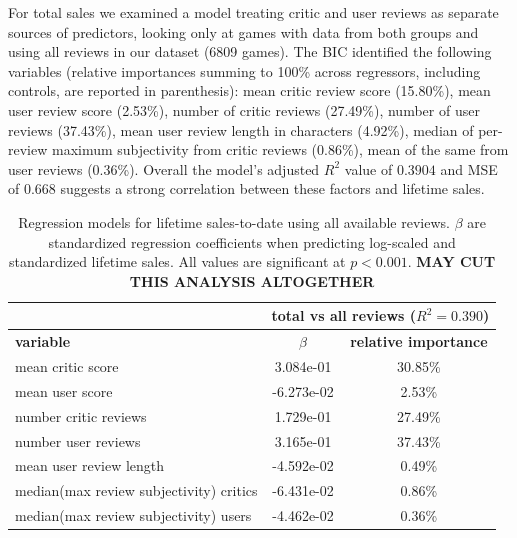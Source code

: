 \documentclass[letterpaper]{article}
\begin{document}
For total sales we examined a model treating critic and user reviews as separate sources of predictors, looking only at games with data from both groups and using all reviews in our dataset (6809 games). The BIC identified the following variables (relative importances summing to 100\% across regressors, including controls, are reported in parenthesis): mean critic review score (15.80\%), mean user review score (2.53\%), number of critic reviews (27.49\%), number of user reviews (37.43\%), mean user review length in characters (4.92\%), median of per-review maximum subjectivity from critic reviews (0.86\%), mean of the same from user reviews (0.36\%). Overall the model's adjusted $R^2$ value of $0.3904$ and MSE of $0.668$ suggests a strong correlation between these factors and lifetime sales.

\begin{table}[tb]
\centering
\scriptsize
\begin{tabularx}{\linewidth}{|X|c|c|}
\hline  & \multicolumn{2}{|c|}{\textbf{total vs all reviews} ($R^2 = 0.390$)}\\ 
\hline \textbf{variable} & \textbf{$\beta$} & \textbf{relative importance}\\ 
\hline mean critic score & 3.084e-01 & 30.85\%\\ 
\hline mean user score & -6.273e-02 & 2.53\%\\ 
\hline number critic reviews & 1.729e-01 & 27.49\%\\ 
\hline number user reviews & 3.165e-01 & 37.43\%\\ 
\hline mean user review length & -4.592e-02 & 0.49\%\\ 
\hline median(max review subjectivity) critics & -6.431e-02 & 0.86\%\\ 
\hline median(max review subjectivity) users & -4.462e-02 & 0.36\%\\ 
\hline 
\end{tabularx}
\caption{Regression models for lifetime sales-to-date using all available reviews. $\beta$ are standardized regression coefficients when predicting log-scaled and standardized lifetime sales. All values are significant at $p < 0.001$. \textbf{MAY CUT THIS ANALYSIS ALTOGETHER}}
\label{tab:sales_totsale_lm}
\end{table}
\end{document}
